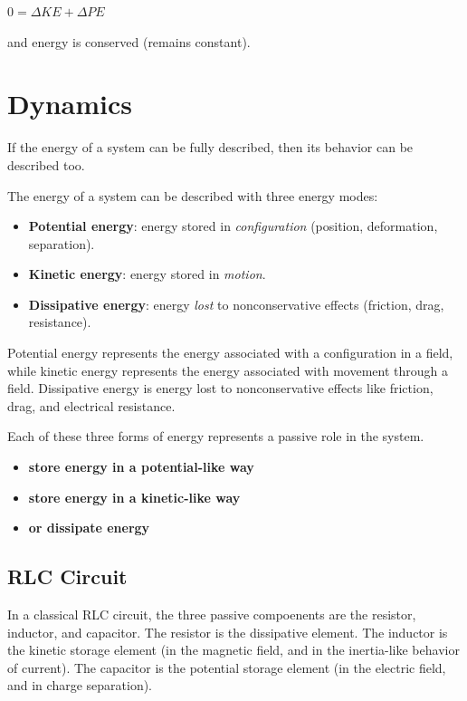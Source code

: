 \documentclass[
  letterpaper,
  DIV=11,
  numbers=noendperiod]{scrartcl}
\providecommand{\tightlist}{%
  \setlength{\itemsep}{0pt}\setlength{\parskip}{0pt}}
\begin{document}
\(0=\Delta KE+\Delta PE\)

and energy is conserved (remains constant).

\section{Dynamics}\label{dynamics}

If the energy of a system can be fully described, then its behavior can
be described too.

The energy of a system can be described with three energy modes:

\begin{itemize}
\tightlist
\item
  \textbf{Potential energy}: energy stored in \emph{configuration}
  (position, deformation, separation).
\item
  \textbf{Kinetic energy}: energy stored in \emph{motion}.
\item
  \textbf{Dissipative energy}: energy \emph{lost} to nonconservative
  effects (friction, drag, resistance).
\end{itemize}

Potential energy represents the energy associated with a configuration
in a field, while kinetic energy represents the energy associated with
movement through a field. Dissipative energy is energy lost to
nonconservative effects like friction, drag, and electrical resistance.

Each of these three forms of energy represents a passive role in the
system.

\begin{itemize}
\tightlist
\item
  \textbf{store energy in a potential-like way}\\
\item
  \textbf{store energy in a kinetic-like way}\\
\item
  \textbf{or dissipate energy}
\end{itemize}

\subsection{RLC Circuit}\label{rlc-circuit}

In a classical RLC circuit, the three passive compoenents are the
resistor, inductor, and capacitor. The resistor is the dissipative
element. The inductor is the kinetic storage element (in the magnetic
field, and in the inertia-like behavior of current). The capacitor is
the potential storage element (in the electric field, and in charge
separation).
\end{document}
